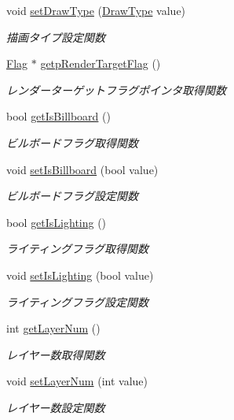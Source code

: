 \begin{DoxyCompactItemize}
void \mbox{\hyperlink{class_draw_order_list_a03d72a3943c45d19b70602ed7f526906}{set\+Draw\+Type}} (\mbox{\hyperlink{class_draw_order_list_a6c9b9ceb312c16d399ef355f4f3486bb}{Draw\+Type}} value)
\begin{DoxyCompactList}\small\item\em 描画タイプ設定関数 \end{DoxyCompactList}\item 
\mbox{\hyperlink{class_flag}{Flag}} $\ast$ \mbox{\hyperlink{class_draw_order_list_a2bc0267f11550e6c231682e0824b25b5}{getp\+Render\+Target\+Flag}} ()
\begin{DoxyCompactList}\small\item\em レンダーターゲットフラグポインタ取得関数 \end{DoxyCompactList}\item 
bool \mbox{\hyperlink{class_draw_order_list_a5d49272331a0f6f8656839ba5fe5e1b6}{get\+Is\+Billboard}} ()
\begin{DoxyCompactList}\small\item\em ビルボードフラグ取得関数 \end{DoxyCompactList}\item 
void \mbox{\hyperlink{class_draw_order_list_a80a404e3308a92dcb9bfa3451518d14e}{set\+Is\+Billboard}} (bool value)
\begin{DoxyCompactList}\small\item\em ビルボードフラグ設定関数 \end{DoxyCompactList}\item 
bool \mbox{\hyperlink{class_draw_order_list_a1015463f08f8bf1118d5d1f79029d869}{get\+Is\+Lighting}} ()
\begin{DoxyCompactList}\small\item\em ライティングフラグ取得関数 \end{DoxyCompactList}\item 
void \mbox{\hyperlink{class_draw_order_list_a90504fdecaa6c022c8b85919352a10b1}{set\+Is\+Lighting}} (bool value)
\begin{DoxyCompactList}\small\item\em ライティングフラグ設定関数 \end{DoxyCompactList}\item 
int \mbox{\hyperlink{class_draw_order_list_afe5cb8651814f631146c91e6428c0b6d}{get\+Layer\+Num}} ()
\begin{DoxyCompactList}\small\item\em レイヤー数取得関数 \end{DoxyCompactList}\item 
void \mbox{\hyperlink{class_draw_order_list_a692fe6ddfbc8ac4167c697a1f8096c57}{set\+Layer\+Num}} (int value)
\begin{DoxyCompactList}\small\item\em レイヤー数設定関数 \end{DoxyCompactList}\end{DoxyCompactItemize}
